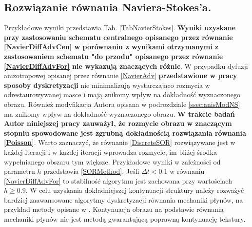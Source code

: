 \documentclass[a4paper,12pt,twoside,openany]{report}
\begin{document}
\subsection{Rozwiązanie równania Naviera-Stokes'a.}
Przykładowe wyniki  przedstawia Tab. \ref{TabNavierStokes}. \textbf{Wyniki uzyskane przy zastosowaniu schematu centralnego opisanego przez równanie \eqref{NavierDiffAdvCen} w porównaniu z wynikami otrzymanymi z zastosowaniem schematu "do przodu" opisanego przez równanie \eqref{NavierDiffAdvFor} nie wykazują znaczących różnic}. W przypadku dyfuzji anizotropowej opisanej przez równanie \eqref{NavierAdv}  \textbf{przedstawione w pracy sposoby dyskretyzacji} nie minimalizują wystarczająco rozmycia w odrestaurowywanej masce i mają znikomy wpływ na dokładność wyznaczonego obrazu. Również modyfikacja Autora opisana w podrozdziale \ref{ssec:anisModNS} ma znikomy wpływ na dokładność wyznaczonego obrazu.
\textbf{W trakcie badań Autor niniejszej pracy zauważył, że rozmycie obrazu w znaczącym stopniu spowodowane jest zgrubną dokładnością rozwiązania równania \eqref{Poisson}}. Warto zaznaczyć, że równanie \eqref{DiscreteSOR} rozwiązywane jest w każdej iteracji i w każdej iteracji wprowadza rozmycie, im bliżej środka wypełnianego obszaru tym większe. Przykładowe wyniki w zależności od parametru $h$  przedstawia \autoref{SORMethod}. Jeśli $\Delta t <0.1$ w równaniu \eqref{NavierDiffAdvFor} to stabilność algorytmu jest zachowana przy wartościach $h \geq 0.9$. W celu uzyskania dokładniejszej kontynuacji struktury należy rozważyć bardziej zaawansowane algorytmy dyskretyzacji równania mechaniki płynów, na przykład metody opisane w \cite{tschumperle2006fast}. Kontynuacja obrazu na podstawie równania mechaniki płynów nie jest metodą gwarantującą poprawną kontynuację tekstury.
\end{document}
